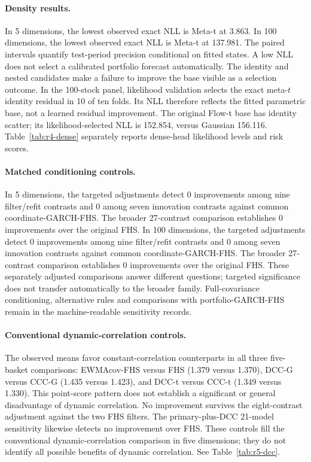 \documentclass[11pt]{article}
\theoremstyle{definition}\newtheorem{definition}[theorem]{Definition}
\theoremstyle{remark}\newtheorem{remark}[theorem]{Remark}
\begin{document}
\paragraph{Density results.}
In 5 dimensions, the lowest observed exact NLL is Meta-t at 3.863. In 100 dimensions, the lowest observed exact NLL is Meta-t at 137.981. The paired intervals quantify test-period precision conditional on fitted states. A low NLL does not select a calibrated portfolio forecast automatically. The identity and nested candidates make a failure to improve the base visible as a selection outcome.
In the 100-stock panel, likelihood validation selects the exact meta-$t$ identity residual in 10 of ten folds. Its NLL therefore reflects the fitted parametric base, not a learned residual improvement. The original Flow-t base has identity scatter; its likelihood-selected NLL is 152.854, versus Gaussian 156.116. Table~\ref{tab:r4-dense} separately reports dense-head likelihood levels and risk scores.

\FloatBarrier



\paragraph{Matched conditioning controls.}
In 5 dimensions, the targeted adjustments detect 0 improvements among nine filter/refit contrasts and 0 among seven innovation contrasts against common coordinate-GARCH-FHS. The broader 27-contrast comparison establishes 0 improvements over the original FHS. In 100 dimensions, the targeted adjustments detect 0 improvements among nine filter/refit contrasts and 0 among seven innovation contrasts against common coordinate-GARCH-FHS. The broader 27-contrast comparison establishes 0 improvements over the original FHS. These separately adjusted comparisons answer different questions; targeted significance does not transfer automatically to the broader family. Full-covariance conditioning, alternative rules and comparisons with portfolio-GARCH-FHS remain in the machine-readable sensitivity records.

\paragraph{Conventional dynamic-correlation controls.}
The observed means favor constant-correlation counterparts in all three five-basket comparisons: EWMAcov-FHS versus FHS (1.379 versus 1.370), DCC-G versus CCC-G (1.435 versus 1.423), and DCC-t versus CCC-t (1.349 versus 1.330). This point-score pattern does not establish a significant or general disadvantage of dynamic correlation. No improvement survives the eight-contrast adjustment against the two FHS filters. The primary-plus-DCC 21-model sensitivity likewise detects no improvement over FHS. These controls fill the conventional dynamic-correlation comparison in five dimensions; they do not identify all possible benefits of dynamic correlation. See Table~\ref{tab:r5-dcc}.
\end{document}
